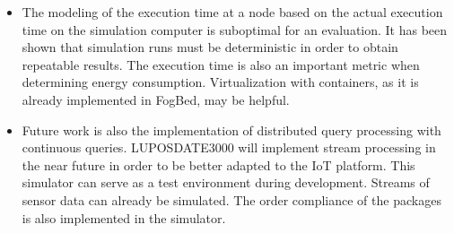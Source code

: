 \documentclass[english,version-2019-11]{uzl-thesis}
\begin{document}
\begin{itemize}
 \item The modeling of the execution time at a node based on the actual execution time on the simulation computer is suboptimal for an evaluation. It has been shown that simulation runs must be deterministic in order to obtain repeatable results. The execution time is also an important metric when determining energy consumption. Virtualization with containers, as it is already implemented in FogBed, may be helpful.
 \item Future work is also the implementation of distributed query processing with continuous queries. LUPOSDATE3000 will implement stream processing in the near future in order to be better adapted to the IoT platform. This simulator can serve as a test environment during development. Streams of sensor data can already be simulated. The order compliance of the packages is also implemented in the simulator.
\end{itemize}


 
\end{document}

